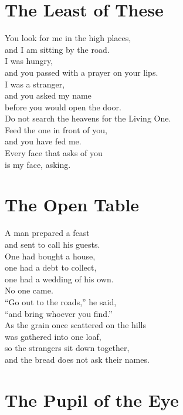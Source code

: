 \documentclass[10pt, openright]{book}
\newcommand{\sectionbreak}{\filbreak}
\newcommand{\sayingsource}[1]{\par\nopagebreak\vspace{0.3\baselineskip}{\raggedleft\footnotesize\itshape #1\par}}
\begin{document}
\sayingsource{Tao Te Ching 63}

\sectionbreak

\section{The Least of These}\label{the-least-of-these}

You look for me in the high places,\\
and I am sitting by the road.\\
I was hungry,\\
and you passed with a prayer on your lips.\\
I was a stranger,\\
and you asked my name\\
before you would open the door.\\
Do not search the heavens for the Living One.\\
Feed the one in front of you,\\
and you have fed me.\\
Every face that asks of you\\
is my face, asking.

\sayingsource{Matthew 25:35--40}

\sectionbreak

\section{The Open Table}\label{the-open-table}

A man prepared a feast\\
and sent to call his guests.\\
One had bought a house,\\
one had a debt to collect,\\
one had a wedding of his own.\\
No one came.\\
``Go out to the roads,'' he said,\\
``and bring whoever you find.''\\
As the grain once scattered on the hills\\
was gathered into one loaf,\\
so the strangers sit down together,\\
and the bread does not ask their names.

\sayingsource{Thomas 64 · Didache 9}

\sectionbreak

\section{The Pupil of the Eye}\label{the-pupil-of-the-eye}
\end{document}
